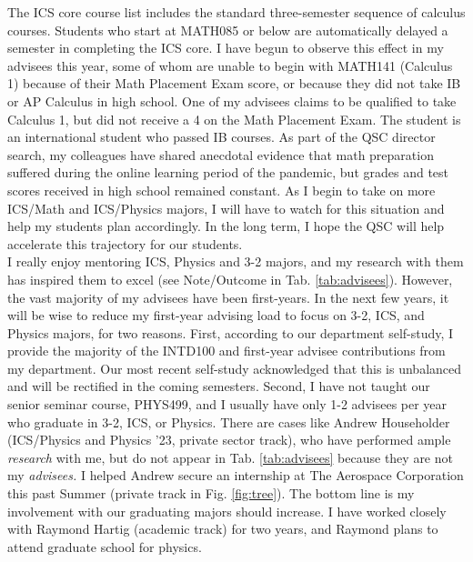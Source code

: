 \documentclass[../../main.tex]{subfiles}
\begin{document}
The ICS core course list includes the standard three-semester sequence of calculus courses.  Students who start at MATH085 or below are automatically delayed a semester in completing the ICS core.  I have begun to observe this effect in my advisees this year, some of whom are unable to begin with MATH141 (Calculus 1) because of their Math Placement Exam score, or because they did not take IB or AP Calculus in high school.  One of my advisees claims to be qualified to take Calculus 1, but did not receive a 4 on the Math Placement Exam.  The student is an international student who passed IB courses.  As part of the QSC director search, my colleagues have shared anecdotal evidence that math preparation suffered during the online learning period of the pandemic, but grades and test scores received in high school remained constant.  As I begin to take on more ICS/Math and ICS/Physics majors, I will have to watch for this situation and help my students plan accordingly.  In the long term, I hope the QSC will help accelerate this trajectory for our students.
\\
\vspace{0.25cm}
I really enjoy mentoring ICS, Physics and 3-2 majors, and my research with them has inspired them to excel (see Note/Outcome in Tab. \ref{tab:advisees}).  However, the vast majority of my advisees have been first-years.  In the next few years, it will be wise to reduce my first-year advising load to focus on 3-2, ICS, and Physics majors, for two reasons.  First, according to our department self-study, I provide the majority of the INTD100 and first-year advisee contributions from my department.  Our most recent self-study acknowledged that this is unbalanced and will be rectified in the coming semesters.  Second, I have not taught our senior seminar course, PHYS499, and I usually have only 1-2 advisees per year who graduate in 3-2, ICS, or Physics.  There are cases like Andrew Householder (ICS/Physics and Physics '23, private sector track), who have performed ample \textit{research} with me, but do not appear in Tab. \ref{tab:advisees} because they are not my \textit{advisees.}  I helped Andrew secure an internship at The Aerospace Corporation this past Summer (private track in Fig. \ref{fig:tree}).  The bottom line is my involvement with our graduating majors should increase.  I have worked closely with Raymond Hartig (academic track) for two years, and Raymond plans to attend graduate school for physics.
\\
\vspace{0.25cm}
\end{document}
